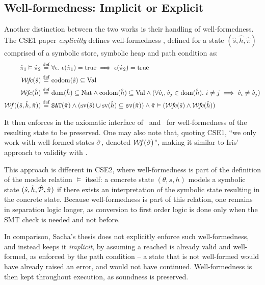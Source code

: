 \subsection{Well-formedness: Implicit or Explicit}
{
\newcommand{\heap}[0]{\hat h}
\newcommand{\store}[0]{\hat s}
\newcommand{\pc}[0]{\hat \pi}
\newcommand{\true}[0]{\text{true}}
Another distinction between the two works is their handling of well-formedness. The CSE1 paper \emph{explicitly} defines well-formedness \Wf, defined for a state $(\store, \heap, \pc)$ comprised of a symbolic store, symbolic heap and path condition as:
\begin{align*}
	\pc_1 \vDash \pc_2 &\defeq \forall\epsilon.~\epsilon(\pc_1)=\true \implies \epsilon(\pc_2)=\true\\
	\Wfc(\store)&\defeq \codom(\store)\subseteq \Val\\
	\Wfc(\heap)&\defeq \dom(\heap)\subseteq\Nat \land\codom(\heap)\subseteq\Val\land (\forall\hat v_i,\hat v_j\in\dom(\heap).~i\neq j \implies \hat v_i \neq \hat v_j)\\
	\Wf((\store,\heap,\pc)) &\defeq \SAT(\pc) \land(\text{sv}(\store)\cup \text{sv}(\heap)\subseteq \code{sv}(\pc)) \land \pc \vDash (\Wfc(\store)\land \Wfc(\heap))
\end{align*}

It then enforces in the axiomatic interface of \consume\ and \produce\ for well-formedness of the resulting state to be preserved. One may also note that, quoting CSE1, ``we only work with well-formed states $\hat{\sigma}$, denoted ${\cal W}\!f(\hat{\sigma})$'', making it similar to Iris' approach to validity with \irisval.

This approach is different in CSE2, where well-formedness is part of the definition of the models relation $\vDash$ itself: a concrete state $(\theta,s,h)$ models a symbolic state $(\store,\heap,\hat{\cal P},\pc)$ if there exists an interpretation of the symbolic state resulting in the concrete state. Because well-formedness is part of this relation, one remains in separation logic longer, as conversion to first order logic is done only when the SMT check is needed and not before.

In comparison, Sacha's thesis does not explicitly enforce such well-formedness, and instead keeps it \emph{implicit}, by assuming a reached is already valid and well-formed, as enforced by the path condition -- a state that is not well-formed would have already raised an error, and would not have continued. Well-formedness is then kept throughout execution, as soundness is preserved.

}
